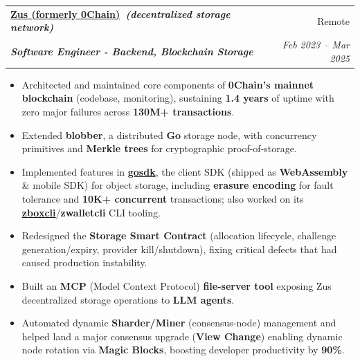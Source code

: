 \documentclass[letterpaper,10pt]{article}
\makeatletter
\newcommand{\resumeItem}[1]{
  \item\small{
    #1 \vspace{-3pt}
  }
}
\newcommand{\resumeSubheading}[4]{
  \item[]
    \begin{tabular*}{0.97\textwidth}{l@{\extracolsep{\fill}}r}
      \textbf{#1} & #2 \\
      \textit{\small#3} & \textit{\small #4} \\
    \end{tabular*}
}
\newcommand{\resumeItemListStart}{\vspace{-2pt}\begin{itemize}[leftmargin=8pt,itemsep=1.5pt,parsep=0pt]
  \selectfont\small
  \setlength\itemsep{1.5pt}
  \setlength\parsep{0em}
  }
\newcommand{\resumeItemListEnd}{\end{itemize}}
\makeatother
\begin{document}
\resumeSubheading
{\href{https://0chain.net}{Zus (formerly 0Chain)}{\normalfont\itshape\small\ (decentralized storage network)}}{Remote}
{\textbf{Software Engineer - Backend, Blockchain Storage}}{Feb 2023 -- Mar 2025}
\resumeItemListStart
\resumeItem{Architected and maintained core components of \textbf{0Chain's mainnet blockchain} (codebase, monitoring), sustaining \textbf{1.4 years} of uptime with zero major failures across \textbf{130M+ transactions}.}
\resumeItem{Extended \textbf{blobber}, a distributed \textbf{Go} storage node, with concurrency primitives and \textbf{Merkle trees} for cryptographic proof-of-storage.}
\resumeItem{Implemented features in \href{https://github.com/0chain/gosdk/pulls?q=is:pr+is:merged+author:yash10019coder}{\textbf{gosdk}}, the client SDK (shipped as \textbf{WebAssembly} \& mobile SDK) for object storage, including \textbf{erasure encoding} for fault tolerance and \textbf{10K+ concurrent} transactions; also worked on its \href{https://github.com/0chain/zboxcli/pulls?q=is:pr+is:merged+author:yash10019coder}{\textbf{zboxcli}}/\textbf{zwalletcli} CLI tooling.}
\resumeItem{Redesigned the \textbf{Storage Smart Contract} (allocation lifecycle, challenge generation/expiry, provider kill/shutdown), fixing critical defects that had caused production instability.}
\resumeItem{Built an \textbf{MCP} (Model Context Protocol) \textbf{file-server tool} exposing Zus decentralized storage operations to \textbf{LLM agents}.}
\resumeItem{Automated dynamic \textbf{Sharder/Miner} (consensus-node) management and helped land a major consensus upgrade (\textbf{View Change}) enabling dynamic node rotation via \textbf{Magic Blocks}, boosting developer productivity by \textbf{90\%}.}
\resumeItemListEnd
\end{document}
